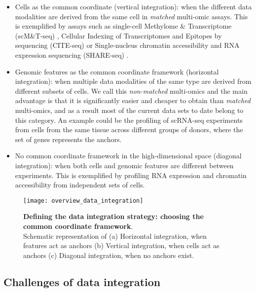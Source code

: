 \begin{itemize}

	\item Cells as the common coordinate (vertical integration): when the different data modalities are derived from the same cell in \textit{matched} multi-omic assays. This is exemplified by assays such as single-cell Methylome \& Transcriptome (scM\&T-seq) \cite{Angermueller2016}, Cellular Indexing of Transcriptomes and Epitopes by sequencing (CITE-seq) \cite{Stoeckius2017} or Single-nucleus chromatin accessibility and RNA expression sequencing (SHARE-seq) \cite{Ma2020}.

	\item Genomic features as the common coordinate framework (horizontal integration): when multiple data modalities of the same type are derived from different subsets of cells. We call this \textit{non-matched} multi-omics and the main advantage is that it is significantly easier and cheaper to obtain than \textit{matched} multi-omics, and as a result most of the current data sets to date belong to this category. An example could be the profiling of scRNA-seq experiments from cells from the same tissue across different groups of donors, where the set of genes represents the anchors.

	\item No common coordinate framework in the high-dimensional space (diagonal integration): when both cells and genomic features are different between experiments. This is exemplified by profiling RNA expression and chromatin accessibility from independent sets of cells.

\end{itemize}

\begin{figure}[H]
	\centering
	\texttt{[image: overview\_data\_integration]}
	\caption{\textbf{Defining the data integration strategy: choosing the common coordinate framework}.\\Schematic representation of (a) Horizontal integration, when features act as anchors (b) Vertical integration, when cells act as anchors (c) Diagonal integration, when no anchors exist. }
	\label{fig:overview_data_integration}
\end{figure}

\subsection{Challenges of data integration}

